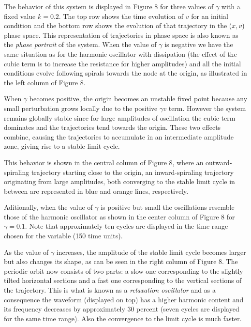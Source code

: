 \documentclass{article}
\begin{document}
The behavior of this system is displayed in Figure 8 for three values of $\gamma$ with a fixed value $k=0.2$. 
The top row shows the time evolution of $v$ for an initial condition and the bottom row shows the evolution of that trajectory in the ($x,v$) phase space.
This representation of trajectories in phase space is also known as the {\em phase portrait} of the system.
When the value of $\gamma$ is negative we have the same situation as for the harmonic oscillator with dissipation (the effect of the cubic term is to increase the resistance for higher amplitudes) and all the initial conditions evolve following spirals towards the node at the origin, as illustrated in the left column of Figure 8.

When $\gamma$ becomes positive, the origin becomes an unstable fixed point because any small perturbation grows locally due to the positive $\gamma v$ term. 
However the system remains globally stable since for large amplitudes of oscillation the cubic term dominates and the trajectories tend towards the origin. 
These two effects combine, causing the trajectories to accumulate in an intermediate amplitude zone, giving rise to a stable limit cycle. 

This behavior is shown in the central column of Figure 8, where an outward-spiraling trajectory starting close to the origin, an inward-spiraling trajectory originating from large amplitudes, both converging to the stable limit cycle in between are represented in blue and orange lines, respectively.
 
Aditionally, when the value of $\gamma$ is positive but small the oscillations resemble those of the harmonic oscillator as shown in the center column of Figure 8 for $\gamma=0.1$. 
Note that approximately ten cycles are displayed in the time range chosen for the variable (150 time units).

As the value of $\gamma$ increases, the amplitude of the stable limit cycle becomes larger but also changes its shape, as can be seen in the right column of Figure 8. 
The periodic orbit now consists of two parts: a slow one corresponding to the slightly tilted horizontal sections and a fast one corresponding to the vertical sections of the trajectory. 
This is what is known as a {\em relaxation oscillator} and as a consequence the waveform (displayed on top) has a higher harmonic content and its frequency decreases by approximately 30 percent (seven cycles are displayed for the same time range). Also the convergence to the limit cycle is much faster.
\end{document}
